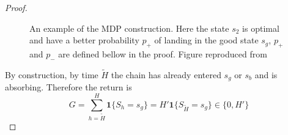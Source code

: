\documentclass[final,12pt]{colt2026} %
\begin{document}
\begin{proof}
\begin{figure}[t]
\caption{An example of the MDP construction. Here the state $s_2$ is optimal and have a better probability $p_+$ of landing in the good state $s_g$, $p_+$ and $p_-$ are defined bellow in the proof. Figure reproduced from \citep{domingues2021episodic}}
\label{fig:hard-mdp}
\end{figure}

By construction, by time $\tilde{H}$ the chain has already entered $s_g$ or $s_b$ and is absorbing. Therefore the return is
\begin{equation*}
G = \sum_{h=\tilde{H}}^{H} \mathbf{1}\{S_h = s_g\} = H'  \mathbf{1}\{S_{\tilde{H}} = s_g\} \in \{0, H'\}
\end{equation*}


\end{proof}
\end{document}
